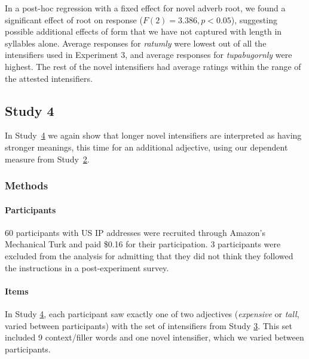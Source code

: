 \documentclass[10pt,letterpaper]{article}
\newcommand{\w}[1]{\emph{#1}}
\newcommand{\todo}[1]{{\color{red}#1}}
\begin{document}

In a post-hoc regression with a fixed effect for novel adverb root, we found a significant effect of root on response ($F(2)=3.386, p<0.05$), suggesting possible additional effects of form that we have not captured with length in syllables alone.
Average responses for \w{ratumly} were lowest out of all the intensifiers used in Experiment 3, and average responses for \w{tupabugornly} were highest.
The rest of the novel intensifiers had average ratings within the range of the attested intensifiers.


\subsection{Study 4 \label{sec:study4}}

In Study~\hyperref[sec:study4]{4} we again show that longer novel intensifiers are interpreted as having stronger meanings, this time for an additional adjective, using our dependent measure from Study~\hyperref[sec:study2]{2}.

\subsubsection{Methods}

\paragraph{Participants}
60 participants with US IP addresses were recruited through Amazon's Mechanical Turk and paid \$0.16 for their participation. 3 participants were excluded from the analysis for admitting that they did not think they followed the instructions in a post-experiment survey.

\paragraph{Items}

In Study \hyperref[sec:study4]{4}, each participant saw exactly one of two adjectives (\w{expensive} or \w{tall}, varied between participants) with the set of intensifiers from Study \hyperref[sec:study3]{3}. This set included 9 context/filler words and one novel intensifier, which we varied between participants.
\end{document}
